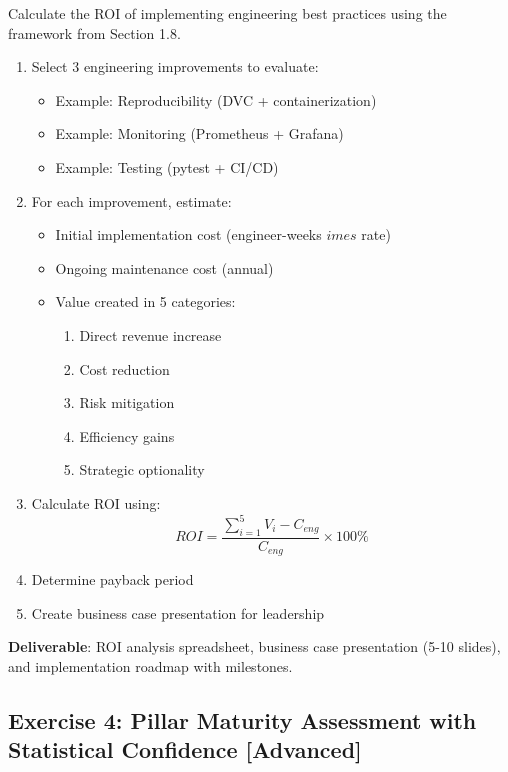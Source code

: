 Calculate the ROI of implementing engineering best practices using the framework from Section 1.8.

\begin{enumerate}
    \item Select 3 engineering improvements to evaluate:
        \begin{itemize}
            \item Example: Reproducibility (DVC + containerization)
            \item Example: Monitoring (Prometheus + Grafana)
            \item Example: Testing (pytest + CI/CD)
        \end{itemize}
    \item For each improvement, estimate:
        \begin{itemize}
            \item Initial implementation cost (engineer-weeks $	imes$ rate)
            \item Ongoing maintenance cost (annual)
            \item Value created in 5 categories:
                \begin{enumerate}
                    \item Direct revenue increase
                    \item Cost reduction
                    \item Risk mitigation
                    \item Efficiency gains
                    \item Strategic optionality
                \end{enumerate}
        \end{itemize}
    \item Calculate ROI using:
        \begin{equation*}
        ROI = \frac{\sum_{i=1}^{5} V_i - C_{eng}}{C_{eng}} \times 100\%
        \end{equation*}
    \item Determine payback period
    \item Create business case presentation for leadership
\end{enumerate}

\textbf{Deliverable}: ROI analysis spreadsheet, business case presentation (5-10 slides), and implementation roadmap with milestones.

\subsection{Exercise 4: Pillar Maturity Assessment with Statistical Confidence [Advanced]}

